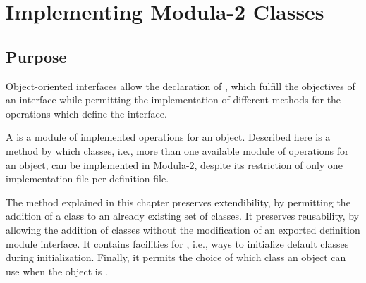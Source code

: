 %
%
%
%

\chapter{Implementing Modula-2 Classes}
\label{ClassesChapter}

\section{Purpose}

Object-oriented interfaces allow the declaration of ,
which fulfill the objectives of
an interface while permitting the implementation of different methods for 
the operations which define the interface.

A  is a module of implemented operations for 
an object.
Described here is a method by which classes, i.e., more than one
available module of operations for an object, can be implemented in
Modula-2, despite its restriction of only one implementation file per
definition file.

The method explained in this chapter preserves extendibility, by 
permitting the addition of a class to an already existing set of classes.  It
preserves reusability, by allowing the addition of classes without
the modification of
an exported definition module interface.  It contains facilities for
, i.e., ways to initialize 
default classes during
initialization.  Finally, it permits the choice of which class an object can
use when the object is .

